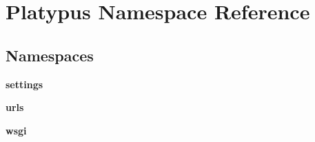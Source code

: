 \section{Platypus Namespace Reference}
\label{namespace_platypus}
\subsection*{Namespaces}
\begin{DoxyCompactItemize}
\item 
 {\bf settings}
\item 
 {\bf urls}
\item 
 {\bf wsgi}
\end{DoxyCompactItemize}
